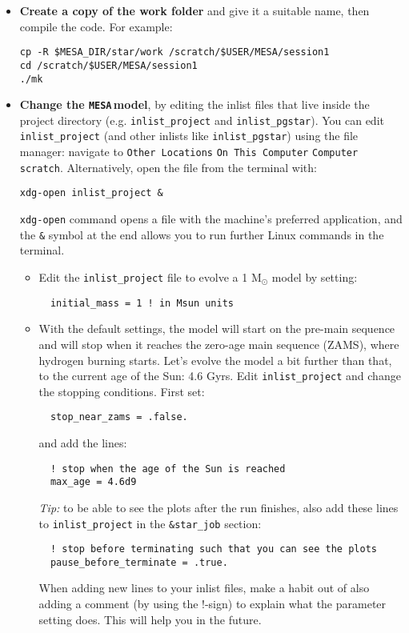 \documentclass[11pt,a4paper]{article}
\newcommand{\MESA}{\texttt{MESA}\,}
\begin{document}
\begin{itemize}

\item \textbf{Create a copy of the work folder} and give it a suitable name, then compile the code. For example:
\begin{lstlisting}
cp -R $MESA_DIR/star/work /scratch/$USER/MESA/session1
cd /scratch/$USER/MESA/session1
./mk
\end{lstlisting}


\item \textbf{Change the \MESA model}, by editing the inlist files that live inside the project directory (e.g. \texttt{inlist\_project} and \texttt{inlist\_pgstar}).
You can edit \verb|inlist_project| (and other inlists like \verb|inlist_pgstar|) using the file manager: navigate to \texttt{Other Locations} \textrightarrow{} \texttt{On This Computer} \textrightarrow{} \texttt{Computer} \textrightarrow{} \texttt{scratch}.  
Alternatively, open the file from the terminal with:
\begin{lstlisting}
xdg-open inlist_project &
\end{lstlisting}
\texttt{xdg-open} command opens a file with the machine's preferred application, and the \texttt{\&} symbol at the end allows you to run further Linux commands in the terminal.

\begin{itemize}
  \item Edit the \verb|inlist_project| file to evolve a 1 M$_\odot$ model by setting:
  \begin{lstlisting}
  initial_mass = 1 ! in Msun units
  \end{lstlisting}


  \item With the default settings, the model will start on the pre-main sequence and will stop when it reaches the zero-age main sequence (ZAMS), where hydrogen burning starts. Let's evolve the model a bit further than that, to the current age of the Sun: 4.6 Gyrs. Edit \verb|inlist_project| and change the stopping conditions. First set:
  \begin{lstlisting}
  stop_near_zams = .false.
  \end{lstlisting}

  and add the lines:
  \begin{lstlisting}
  ! stop when the age of the Sun is reached
  max_age = 4.6d9
  \end{lstlisting}

  \textit{Tip:} to be able to see the plots after the run finishes, also add these lines to \verb|inlist_project| in the \verb|&star_job| section:
  \begin{lstlisting}
  ! stop before terminating such that you can see the plots
  pause_before_terminate = .true.
  \end{lstlisting}
  When adding new lines to your inlist files, make a habit out of also adding a comment (by using the !-sign) to explain what the parameter setting does. This will help you in the future.

\end{itemize}

\end{itemize}
\end{document}
